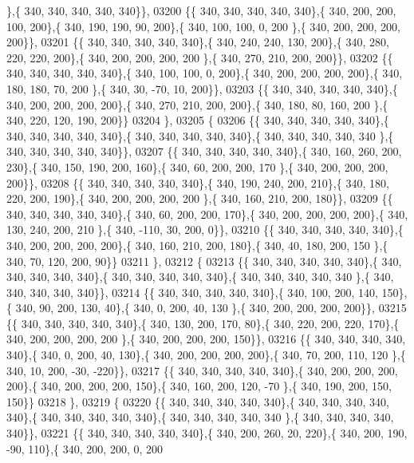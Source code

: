 \begin{DoxyCode}
      \},\{ 340, 340, 340, 340, 340\}\},
03200 \{\{ 340, 340, 340, 340, 340\},\{ 340, 200, 200, 100, 200\},\{ 340, 190, 190,  90, 200\},\{ 340, 100, 100,   0, 200
      \},\{ 340, 200, 200, 200, 200\}\},
03201 \{\{ 340, 340, 340, 340, 340\},\{ 340, 240, 240, 130, 200\},\{ 340, 280, 220, 220, 200\},\{ 340, 200, 200, 200, 200
      \},\{ 340, 270, 210, 200, 200\}\},
03202 \{\{ 340, 340, 340, 340, 340\},\{ 340, 100, 100,   0, 200\},\{ 340, 200, 200, 200, 200\},\{ 340, 180, 180,  70, 200
      \},\{ 340,  30, -70,  10, 200\}\},
03203 \{\{ 340, 340, 340, 340, 340\},\{ 340, 200, 200, 200, 200\},\{ 340, 270, 210, 200, 200\},\{ 340, 180,  80, 160, 200
      \},\{ 340, 220, 120, 190, 200\}\}
03204 \},
03205 \{
03206 \{\{ 340, 340, 340, 340, 340\},\{ 340, 340, 340, 340, 340\},\{ 340, 340, 340, 340, 340\},\{ 340, 340, 340, 340, 340
      \},\{ 340, 340, 340, 340, 340\}\},
03207 \{\{ 340, 340, 340, 340, 340\},\{ 340, 160, 260, 200, 230\},\{ 340, 150, 190, 200, 160\},\{ 340,  60, 200, 200, 170
      \},\{ 340, 200, 200, 200, 200\}\},
03208 \{\{ 340, 340, 340, 340, 340\},\{ 340, 190, 240, 200, 210\},\{ 340, 180, 220, 200, 190\},\{ 340, 200, 200, 200, 200
      \},\{ 340, 160, 210, 200, 180\}\},
03209 \{\{ 340, 340, 340, 340, 340\},\{ 340,  60, 200, 200, 170\},\{ 340, 200, 200, 200, 200\},\{ 340, 130, 240, 200, 210
      \},\{ 340, -110,  30, 200,   0\}\},
03210 \{\{ 340, 340, 340, 340, 340\},\{ 340, 200, 200, 200, 200\},\{ 340, 160, 210, 200, 180\},\{ 340,  40, 180, 200, 150
      \},\{ 340,  70, 120, 200,  90\}\}
03211 \},
03212 \{
03213 \{\{ 340, 340, 340, 340, 340\},\{ 340, 340, 340, 340, 340\},\{ 340, 340, 340, 340, 340\},\{ 340, 340, 340, 340, 340
      \},\{ 340, 340, 340, 340, 340\}\},
03214 \{\{ 340, 340, 340, 340, 340\},\{ 340, 100, 200, 140, 150\},\{ 340,  90, 200, 130,  40\},\{ 340,   0, 200,  40, 130
      \},\{ 340, 200, 200, 200, 200\}\},
03215 \{\{ 340, 340, 340, 340, 340\},\{ 340, 130, 200, 170,  80\},\{ 340, 220, 200, 220, 170\},\{ 340, 200, 200, 200, 200
      \},\{ 340, 200, 200, 200, 150\}\},
03216 \{\{ 340, 340, 340, 340, 340\},\{ 340,   0, 200,  40, 130\},\{ 340, 200, 200, 200, 200\},\{ 340,  70, 200, 110, 120
      \},\{ 340,  10, 200, -30, -220\}\},
03217 \{\{ 340, 340, 340, 340, 340\},\{ 340, 200, 200, 200, 200\},\{ 340, 200, 200, 200, 150\},\{ 340, 160, 200, 120, -70
      \},\{ 340, 190, 200, 150, 150\}\}
03218 \},
03219 \{
03220 \{\{ 340, 340, 340, 340, 340\},\{ 340, 340, 340, 340, 340\},\{ 340, 340, 340, 340, 340\},\{ 340, 340, 340, 340, 340
      \},\{ 340, 340, 340, 340, 340\}\},
03221 \{\{ 340, 340, 340, 340, 340\},\{ 340, 200, 260,  20, 220\},\{ 340, 200, 190, -90, 110\},\{ 340, 200, 200,   0, 200

\end{DoxyCode}
